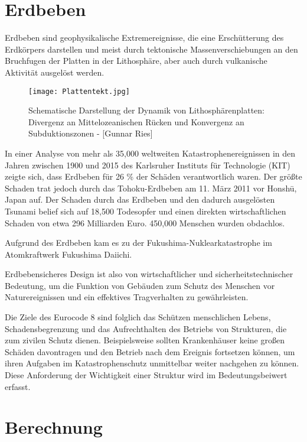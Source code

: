 \section{Erdbeben}
\label{sec:erdbeben}

Erdbeben sind geophysikalische Extremereignisse, die eine Erschütterung des Erdkörpers darstellen und meist durch tektonische Massenverschiebungen an den Bruchfugen der Platten in der Lithosphäre, aber auch durch vulkanische Aktivität ausgelöst werden. \cite{ETHZ}

\begin{figure}[ht]
    \centering
    \texttt{[image: Plattentekt.jpg]}
    \caption{Schematische Darstellung der Dynamik von Lithosphärenplatten: Divergenz an Mittelozeanischen Rücken und Konvergenz an Subduktionszonen - [Gunnar Ries]}
\end{figure}

In einer Analyse von mehr als 35,000 weltweiten Katastrophenereignissen in den Jahren zwischen 1900 und 2015 des Karlsruher Instituts für Technologie (KIT) zeigte sich, dass Erdbeben für 26 \% der Schäden verantwortlich waren.
Der größte Schaden trat jedoch durch das Tohoku-Erdbeben am 11. März 2011 vor Honshū, Japan auf. Der Schaden durch das Erdbeben und den dadurch ausgelösten Tsunami belief sich auf 18,500 Todesopfer und einen direkten wirtschaftlichen Schaden von etwa 296 Milliarden Euro. 450,000 Menschen wurden obdachlos. \cite{DANIELL}

Aufgrund des Erdbeben kam es zu der Fukushima-Nuklearkatastrophe im Atomkraftwerk Fukushima Daiichi.

Erdbebensicheres Design ist also von wirtschaftlicher und sicherheitstechnischer Bedeutung, um die Funktion von Gebäuden zum Schutz des Menschen vor Naturereignissen und ein effektives Tragverhalten zu gewährleisten.

Die Ziele des Eurocode 8 sind folglich das Schützen menschlichen Lebens, Schadensbegrenzung und das Aufrechthalten des Betriebs von Strukturen, die zum zivilen Schutz dienen. Beispielsweise sollten Krankenhäuser keine großen Schäden davontragen und den Betrieb nach dem Ereignis fortsetzen können, um ihren Aufgaben im Katastrophenschutz unmittelbar weiter nachgehen zu können.
Diese Anforderung der Wichtigkeit einer Struktur wird im Bedeutungsbeiwert erfasst. \cite{EC8}

\section{Berechnung}
\label{sec:berechnung}

